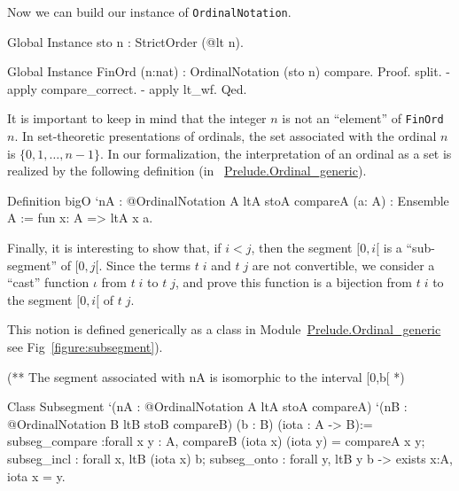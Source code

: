 Now we can build our instance of \texttt{OrdinalNotation}.

\begin{Coqsrc}
Global Instance sto n : StrictOrder (@lt n).

Global Instance FinOrd (n:nat) : OrdinalNotation (sto n) compare.
Proof.
  split.
  - apply compare_correct.
  - apply lt_wf.
Qed.
\end{Coqsrc}

\begin{remark}
It is important to keep in mind  that the integer $n$ is not an ``element'' of \texttt{FinOrd $n$}. In set-theoretic presentations of ordinals, the set associated with the ordinal $n$ is $\{0,1,\dots,n-1\}$. 
In our formalization, the interpretation of an ordinal as a set is realized by the following definition
(in ~\href{../src/html/hydras.Prelude.Ordinal_generic.html}{Prelude.Ordinal\_generic}).

\begin{Coqsrc}
Definition bigO `{nA : @OrdinalNotation A ltA stoA compareA}
           (a: A) : Ensemble A :=
  fun x: A => ltA x a.
\end{Coqsrc}
\end{remark}



Finally, it is interesting to show that, if $i<j$, then the segment $[0,i[$ is a ``sub-segment'' of
$[0,j[$. Since the terms  $t\;i$ and $t\;j$ are not convertible, we consider a ``cast'' 
function $\iota$ from $t\;i$ to $t\;j$, and prove this function is  a bijection  from $t\;i$ to
the segment $[0,i[$ of $t\;j$.




This notion is defined generically as a class in
 Module~\href{../src/html/hydras.Prelude.Ordinal-generic.html}{Prelude.Ordinal\_generic} see Fig~\vref{figure:subsegment}).

\begin{Coqsrc}
(** The segment associated with nA is isomorphic to
    the interval [0,b[ *)

Class  Subsegment 
       `(nA : @OrdinalNotation A ltA stoA compareA)
       `(nB : @OrdinalNotation B ltB stoB compareB)
       (b :  B)
       (iota : A -> B):=
  {
  subseg_compare :forall x y : A,  compareB (iota x) (iota y) =
                                 compareA x y;
  subseg_incl : forall x, ltB (iota x) b;
  subseg_onto : forall y, ltB y b  -> exists x:A, iota x = y}.
\end{Coqsrc}


